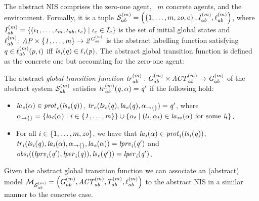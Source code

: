 The abstract  NIS comprises the zero-one agent, ~$m$
concrete agents, and the environment. 
Formally, it is a tuple $\mathcal S_{ab}^{(m)} = \left ( \left \{ 1,\ldots,m,zo,e \right \},
I^{({m})}_{ab}, \ell^{(m)}_{ab} \right )$, where $I^{({m})}_{ab} =
\left \{ \left ( \iota_{1}, \ldots, \iota_{m}, \iota_{ab}, \iota_{e} \right )
\mid \iota_{e} \in I_e \right \}$ is the set of initial global
states   and $\ell^{(m)}_{ab} \colon \it{AP} \times \left \{ 1, \ldots, m  \right \}
\rightarrow 2^{G^{(m)}_{ab}}$ is the abstract labelling function
satisfying $q \in \ell^{(m)}_{ab}(p,i)$ iff $\it{ls}_{i}(q) \in \ell_{i}(p)$. 
The abstract global transition function is  defined
as the concrete one but accounting  for the zero-one agent:
\begin{definition}
  \label{def:abglobaltransition}
  The abstract {\em global transition function}
    $\it{tr}^{(m)}_{ab} : G^{(m)}_{ab}
  \times \mathit{ACT}^{(m)}_{ab} \rightarrow
    G^{(m)}_{ab}$ of the abstract
    system $\mathcal{S}^{(m)}_{ab}$ satisfies
    $\it{tr}^{(m)}_{ab}(q, \alpha) = q'$ if the
  following hold:
  \begin{itemize}
      \item $\it{la}_{e}({\alpha}) \in
          \mathit{prot}_{e}(\it{ls}_{e}(q))$,  $\mathit{tr}_{e}(\it{ls}_{e}(q),
          \it{la}_{e}({q}), \alpha_{\rightarrow\{\}}) = q'$, 
          where $\alpha_{\rightarrow\{\}} = 
          \left \{ \it{la}_{i}({\alpha}) \mid i \in \left \{ 1,\ldots,m \right \} \right \} \cup
          \left \{ \alpha_t \mid (l_t, \alpha_t) \in
          \it{la}_{zo}({\alpha}) \text{ for some } l_t \right \}$.
    \item For all $i \in \left \{ 1,\ldots,m, \it{zo} \right \}$, we have that
    $\it{la}_{i}({\alpha}) \in \mathit{prot}_{i}(\it{ls}_{i}(q))$, $\mathit{tr}_{i} (\it{ls}_{i}(q), \it{la}_{i}({\alpha}),
    \alpha_{\rightarrow\{\}}, \it{la}_{e}({\alpha})) = \it{lprv}_{i}(q')$
          and $\mathit{obs}_{i}((\it{lprv}_{i}(q'),\it{lper}_{i}(q)),\it{ls}_{e}(q')) = \it{lper}_{i}(q')$.
  \end{itemize}
\end{definition}
Given the
abstract global transition function we can  associate an (abstract)
model  $\mathcal{M}_{\mathcal{S}_{ab}^{(m)}} = \left ( G^{(m)}_{ab}, \mathit{ACT}^{(m)}_{ab}, T^{(m)}_{ab},
\ell^{(m)}_{ab} \right )$ to the abstract NIS in a similar manner to
the concrete case.

